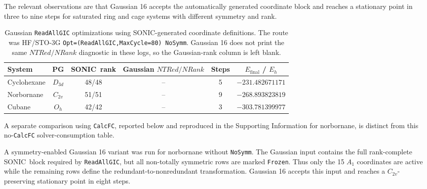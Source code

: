 \documentclass[journal=jctcce,manuscript=article,layout=traditional]{achemso}
\newcommand{\SONIC}{SONIC}
\theoremstyle{definition}
\begin{document}
The relevant observations are that Gaussian 16 accepts the automatically
generated coordinate block and reaches a stationary point in three to nine
steps for saturated ring and cage systems with different symmetry and rank.

\begin{table}[htbp]
\centering
\caption{Gaussian \texttt{ReadAllGIC} optimizations using \SONIC{}-generated
coordinate definitions.  The route was HF/STO-3G
\texttt{Opt=(ReadAllGIC,MaxCycle=80) NoSymm}.  Gaussian 16 does not print the
same \(NTRed/NRank\) diagnostic in these logs, so the Gaussian-rank column is
left blank.}
\label{tab:readallgic-opt}
\begin{tabular}{lccccc}
\toprule
System & PG & \SONIC\ rank & Gaussian \(NTRed/NRank\) & Steps & \(E_\mathrm{final}\) / \(E_h\) \\
\midrule
Cyclohexane & \(D_{3d}\) & 48/48 & -- & 5 & \(-231.482671171\) \\
Norbornane & \(C_{2v}\) & 51/51 & -- & 9 & \(-268.893823819\) \\
Cubane & \(O_h\) & 42/42 & -- & 3 & \(-303.781399977\) \\
\bottomrule
\end{tabular}
\end{table}

A separate comparison using \texttt{CalcFC}, reported below and reproduced in
the Supporting Information for norbornane, is distinct from this
no-\texttt{CalcFC} solver-consumption table.

A symmetry-enabled Gaussian 16 variant was run for norbornane without
\texttt{NoSymm}.  The
Gaussian input contains the full rank-complete \SONIC\ block required by
\texttt{ReadAllGIC}, but all non-totally symmetric rows are marked
\texttt{Frozen}.  Thus only the 15 \(A_1\) coordinates are active while the
remaining rows define the redundant-to-nonredundant transformation.  Gaussian
16 accepts this input and reaches a \(C_{2v}\)-preserving stationary point in
eight steps.
\end{document}
